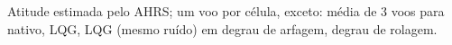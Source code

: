 Atitude estimada pelo AHRS; um voo por célula, exceto: média de 3 voos para nativo, LQG, LQG (mesmo ruído) em degrau de arfagem, degrau de rolagem.

